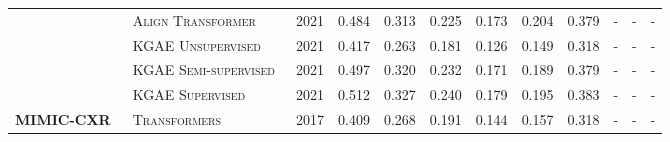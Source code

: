 \documentclass[10pt,journal,compsoc]{IEEEtran}
\begin{document}
\begin{table}
{\begin{tabular}{|c|l|l|llllll|lll|}
                                      & \textsc{Align Transformer~\cite{you2021aligntransformer}}                                    & 2021                           & 0.484                    & 0.313                    & 0.225                    & 0.173                    & 0.204                   & 0.379                     & -                     & -                     & -                        \\ 
                        & \textsc{KGAE Unsupervised~\cite{liu2021auto}}                                    & 2021                           & 0.417                    & 0.263                    & 0.181                    & 0.126                    & 0.149                   & 0.318                     & -                     & -                     & -                        \\ 
                                  & \textsc{KGAE Semi-supervised~\cite{liu2021auto}}                                    & 2021                           & 0.497                    & 0.320                    & 0.232                    & 0.171                    & 0.189                   & 0.379                     & -                     & -                     & -                        \\ 
                                  & \textsc{KGAE Supervised~\cite{liu2021auto}}                                    & 2021                           & 0.512                    & 0.327                    & 0.240                    & 0.179                    & 0.195                   & 0.383                     & -                     & -                     & -                        \\   
\hline
\multirow{12}{*}{\textbf{\textsc{MIMIC-CXR~\cite{johnson2019mimic}} }} & \textsc{Transformers~\cite{vaswani2017attention}}                                         & 2017                           & 0.409                    & 0.268                    & 0.191                    & 0.144                    & 0.157                   & 0.318                     & -                     & -                     & -                        \\


\end{tabular}}
\end{table}
\end{document}
